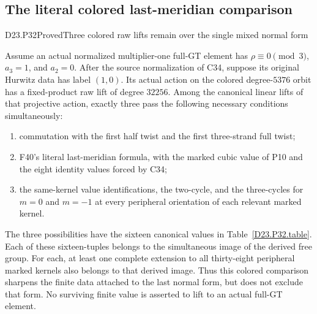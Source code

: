 \subsection{The literal colored last-meridian comparison}

\begin{statement}{D23.P32}{Proved}{Three colored raw lifts remain over the single mixed normal form}
\end{statement}
Assume an actual normalized multiplier-one full-GT element has
$\rho\equiv0\pmod3$, $a_3=1$, and $a_2=0$.
After the source normalization of C34, suppose its original
Hurwitz data has label $(1,0)$. Its actual action on the
colored degree-$5376$ orbit has a fixed-product raw lift of
degree $32256$. Among the canonical linear lifts of that
projective action, exactly three pass the following necessary
conditions simultaneously:
\begin{enumerate}
\item commutation with the first half twist and the first
three-strand full twist;
\item F40's literal last-meridian formula, with the marked
cubic value of P10 and the eight identity values forced by C34;
\item the same-kernel value identifications, the two-cycle,
and the three-cycles for $m=0$ and $m=-1$ at every peripheral
orientation of each relevant marked kernel.
\end{enumerate}
The three possibilities have the sixteen canonical values
in Table~\ref{D23.P32.table}. Each of these sixteen-tuples
belongs to the simultaneous image of the derived free group.
For each, at least one complete extension to all thirty-eight
peripheral marked kernels also belongs to that derived image.
Thus this colored comparison sharpens the finite data attached
to the last normal form, but does not exclude that form.
No surviving finite value is asserted to lift to an actual
full-GT element.

